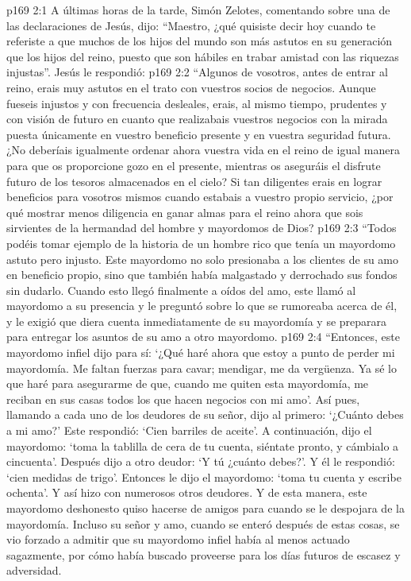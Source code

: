 \vs p169 2:1 A últimas horas de la tarde, Simón Zelotes, comentando sobre una de las declaraciones de Jesús, dijo: “Maestro, ¿qué quisiste decir hoy cuando te referiste a que muchos de los hijos del mundo son más astutos en su generación que los hijos del reino, puesto que son hábiles en trabar amistad con las riquezas injustas”. Jesús le respondió:
\vs p169 2:2 \pc “Algunos de vosotros, antes de entrar al reino, erais muy astutos en el trato con vuestros socios de negocios. Aunque fueseis injustos y con frecuencia desleales, erais, al mismo tiempo, prudentes y con visión de futuro en cuanto que realizabais vuestros negocios con la mirada puesta únicamente en vuestro beneficio presente y en vuestra seguridad futura. ¿No deberíais igualmente ordenar ahora vuestra vida en el reino de igual manera para que os proporcione gozo en el presente, mientras os aseguráis el disfrute futuro de los tesoros almacenados en el cielo? Si tan diligentes erais en lograr beneficios para vosotros mismos cuando estabais a vuestro propio servicio, ¿por qué mostrar menos diligencia en ganar almas para el reino ahora que sois sirvientes de la hermandad del hombre y mayordomos de Dios?
\vs p169 2:3 “Todos podéis tomar ejemplo de la historia de un hombre rico que tenía un mayordomo astuto pero injusto. Este mayordomo no solo presionaba a los clientes de su amo en beneficio propio, sino que también había malgastado y derrochado sus fondos sin dudarlo. Cuando esto llegó finalmente a oídos del amo, este llamó al mayordomo a su presencia y le preguntó sobre lo que se rumoreaba acerca de él, y le exigió que diera cuenta inmediatamente de su mayordomía y se preparara para entregar los asuntos de su amo a otro mayordomo.
\vs p169 2:4 “Entonces, este mayordomo infiel dijo para sí: ‘¿Qué haré ahora que estoy a punto de perder mi mayordomía. Me faltan fuerzas para cavar; mendigar, me da vergüenza. Ya sé lo que haré para asegurarme de que, cuando me quiten esta mayordomía, me reciban en sus casas todos los que hacen negocios con mi amo’. Así pues, llamando a cada uno de los deudores de su señor, dijo al primero: ‘¿Cuánto debes a mi amo?’ Este respondió: ‘Cien barriles de aceite’. A continuación, dijo el mayordomo: ‘toma la tablilla de cera de tu cuenta, siéntate pronto, y cámbialo a cincuenta’. Después dijo a otro deudor: ‘Y tú ¿cuánto debes?’. Y él le respondió: ‘cien medidas de trigo’. Entonces le dijo el mayordomo: ‘toma tu cuenta y escribe ochenta’. Y así hizo con numerosos otros deudores. Y de esta manera, este mayordomo deshonesto quiso hacerse de amigos para cuando se le despojara de la mayordomía. Incluso su señor y amo, cuando se enteró después de estas cosas, se vio forzado a admitir que su mayordomo infiel había al menos actuado sagazmente, por cómo había buscado proveerse para los días futuros de escasez y adversidad.
